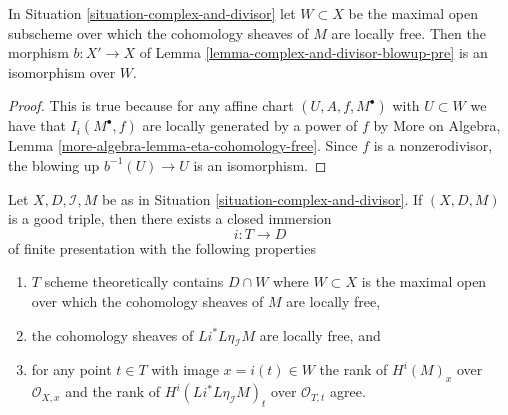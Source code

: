 \begin{lemma}
\label{lemma-complex-and-divisor-blowup-good}
In Situation \ref{situation-complex-and-divisor} let $W \subset X$
be the maximal open subscheme over which the cohomology sheaves
of $M$ are locally free. Then the morphism $b : X' \to X$
of Lemma \ref{lemma-complex-and-divisor-blowup-pre} is an isomorphism
over $W$.
\end{lemma}

\begin{proof}
This is true because for any affine chart $(U, A, f, M^\bullet)$
with $U \subset W$ we have that $I_i(M^\bullet, f)$ are locally
generated by a power of $f$ by
More on Algebra, Lemma \ref{more-algebra-lemma-eta-cohomology-free}.
Since $f$ is a nonzerodivisor,
the blowing up $b^{-1}(U) \to U$ is an isomorphism.
\end{proof}

\begin{lemma}
\label{lemma-complex-and-divisor-blowup-good-T}
Let $X, D, \mathcal{I}, M$ be as in
Situation \ref{situation-complex-and-divisor}.
If $(X, D, M)$ is a good triple, then there exists a
closed immersion
$$
i : T \longrightarrow D
$$
of finite presentation with the following properties
\begin{enumerate}
\item $T$ scheme theoretically contains $D \cap W$
where $W \subset X$ is the maximal open over which the
cohomology sheaves of $M$ are locally free,
\item the cohomology sheaves of $Li^*L\eta_\mathcal{I}M$
are locally free, and
\item for any point $t \in T$ with image $x = i(t) \in W$ the rank
of $H^i(M)_x$ over $\mathcal{O}_{X, x}$ and the rank
of $H^i(Li^*L\eta_\mathcal{I}M)_t$ over $\mathcal{O}_{T, t}$ agree.
\end{enumerate}
\end{lemma}

